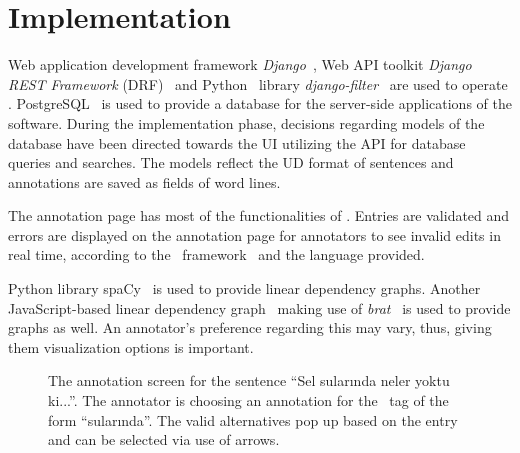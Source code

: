 \section{Implementation}
\label{sec:implementation}

Web application development framework \textit{Django}~\cite{django}, Web API toolkit \textit{Django REST Framework} (DRF)~\cite{drf} and Python~\cite{python} library \textit{django-filter}~\cite{django-filter} are used to operate \boatvtwo.
PostgreSQL~\cite{psql} is used to provide a database for the server-side applications of the software.
During the implementation phase, decisions regarding models of the database have been directed towards the UI utilizing the API for database queries and searches.
The models reflect the UD format of sentences and annotations are saved as fields of word lines.

The annotation page has most of the functionalities of \boatvone.
Entries are validated and errors are displayed on the annotation page for annotators to see invalid edits in real time, according to the \ud\ framework~\cite{UD-git} and the language provided.

Python library spa\textsc{C}y~\cite{spacy} is used to provide linear dependency graphs.
Another JavaScript-based linear dependency graph~\cite{spyssalo} making use of \textit{brat}~\cite{brat-vis} is used to provide graphs as well.
An annotator's preference regarding this may vary, thus, giving them visualization options is important.

\begin{figure}[tbh]
    \centering
    \caption{The annotation screen for the sentence ``Sel sularında neler yoktu ki...''.
        The annotator is choosing an annotation for the \deprel\ tag of the form ``sularında''.
        The valid alternatives pop up based on the entry and can be selected via use of arrows. }
    \label{fig:anno-fig}
\end{figure}


